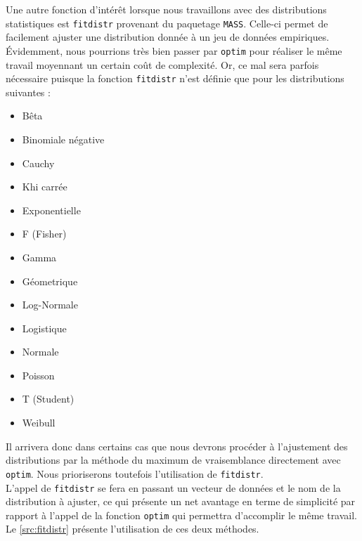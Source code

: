 Une autre fonction d'intérêt lorsque nous travaillons avec des distributions statistiques est \texttt{fitdistr} provenant du paquetage \texttt{MASS}. Celle-ci permet de facilement ajuster une distribution donnée à un jeu de données empiriques. Évidemment, nous pourrions très bien passer par \texttt{optim} pour réaliser le même travail moyennant un certain coût de complexité. Or, ce mal sera parfois nécessaire puisque la fonction \texttt{fitdistr} n'est définie que pour les distributions suivantes : \cite{MASS}

\begin{minipage}{\linewidth}
	\begin{multicols}{2}
		\begin{itemize}
			\item Bêta
			\item Binomiale négative
			\item Cauchy
			\item Khi carrée
			\item Exponentielle
			\item F (Fisher)
			\item Gamma
			\columnbreak
			\item Géometrique
			\item Log-Normale
			\item Logistique
			\item Normale
			\item Poisson
			\item T (Student)
			\item Weibull
		\end{itemize}
	\end{multicols}
\end{minipage}
\vspace{\baselineskip}

Il arrivera donc dans certains cas que nous devrons procéder à l'ajustement des distributions par la méthode du maximum de vraisemblance directement avec \texttt{optim}. Nous prioriserons toutefois l'utilisation de \texttt{fitdistr}. \\

L'appel de \texttt{fitdistr} se fera en passant un vecteur de données et le nom de la distribution à ajuster, ce qui présente un net avantage en terme de simplicité par rapport à l'appel de la fonction \texttt{optim} qui permettra d'accomplir le même travail. Le \autoref{src:fitdistr} présente l'utilisation de ces deux méthodes. \\

